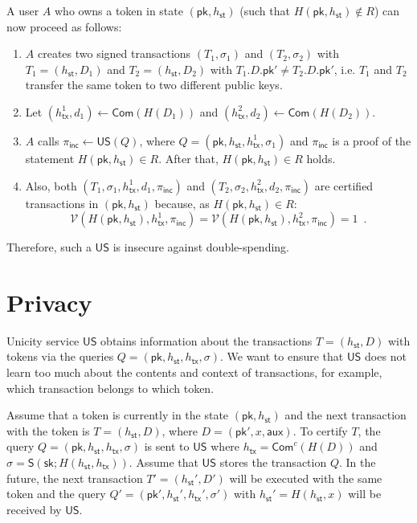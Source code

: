 \documentclass{article}
\newcommand{\sig}[0]{\mathsf{S}}
\newcommand{\pubkey}[0]{\mathsf{pk}}
\newcommand{\prikey}[0]{\mathsf{sk}}
\newcommand{\commit}[0]{\mathsf{Com}}
\newcommand{\commitc}[0]{\mathsf{Com}^{c}}
\newcommand{\unisrv}[0]{\mathsf{US}}
\newcommand{\sthash}[0]{h_\mathsf{st}}
\newcommand{\txhash}[0]{h_\mathsf{tx}}
\newcommand{\univer}[0]{\mathcal{V}}
\newcommand{\pinc}[0]{\pi_{\mathsf{inc}}}
\begin{document}
\noindent A user $A$ who owns a token in state $(\pubkey,\sthash)$ (such that $H(\pubkey,\sthash)\not\in R$) can now proceed as follows:
\begin{enumerate}
\item $A$ creates two signed transactions $(T_1,\sigma_1)$ and $(T_2,\sigma_2)$ with
$T_1=(\sthash,D_1)$ and $T_2=(\sthash,D_2)$ with $T_1.D.\pubkey'\neq T_2.D.\pubkey'$, i.e. $T_1$ and $T_2$ transfer the same token to two different public keys.
\item Let $(\txhash^1,d_1)\gets \commit(H(D_1))$ and $(\txhash^2,d_2)\gets \commit(H(D_2))$.
\item $A$ calls $\pinc\gets\unisrv(Q)$, where $Q=(\pubkey,\sthash,\txhash^1,\sigma_1)$ and $\pinc$ is a proof of the statement $H(\pubkey,\sthash)\in R$. After that, $H(\pubkey,\sthash)\in R$ holds.
\item Also, both $(T_1,\sigma_1,\txhash^1,d_1, \pinc)$ and $(T_2,\sigma_2,\txhash^2,d_2, \pinc)$ are certified transactions in $(\pubkey,\sthash)$ because, as $H(\pubkey,\sthash)\in R$:
\[
\univer(H(\pubkey,\sthash),\txhash^1,\pinc)=
\univer(H(\pubkey,\sthash),\txhash^2,\pinc)=1\enspace.
\]
\end{enumerate}

\noindent Therefore, such a $\unisrv$ is insecure against double-spending.

\section{Privacy}

Unicity service $\unisrv$ obtains information about the transactions $T=(\sthash,D)$ with tokens via the queries $Q=(\pubkey, \sthash, \txhash,\sigma)$. We want to ensure that $\unisrv$ does not learn too much about the contents and context of transactions, for example, which transaction belongs to which token.

Assume that a token is currently in the state $(\pubkey,\sthash)$ and the next transaction with the token is $T=(\sthash, D)$, where $D=(\pubkey',x,\mathsf{aux})$. To certify $T$, the query
$Q=(\pubkey,\sthash,\txhash,\sigma)$ is sent to $\unisrv$ where $\txhash=\commitc(H(D))$ and $\sigma = \sig(\prikey; H(\sthash,\txhash))$.
Assume that $\unisrv$ stores the transaction $Q$.
In the future, the next transaction $T'=(\sthash',D')$ will be executed with the same token and the query
$Q'=(\pubkey',\sthash',\txhash',\sigma')$ with $\sthash'=H(\sthash,x)$ will be received by $\unisrv$.
\end{document}

